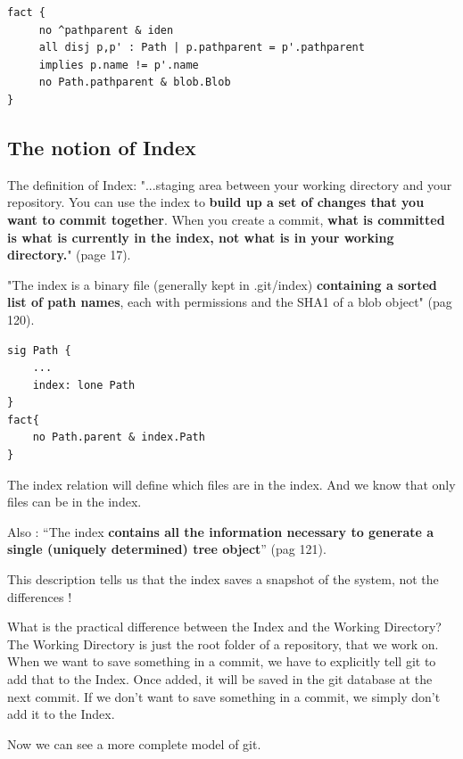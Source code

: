 \begin{lstlisting}
fact {
	 no ^pathparent & iden
	 all disj p,p' : Path | p.pathparent = p'.pathparent
	 implies p.name != p'.name
	 no Path.pathparent & blob.Blob
}
\end{lstlisting}

\subsection{The notion of Index}

The definition of Index:
"...staging area between your working directory and your
repository. You can use the index to {\bf build up a set of 
changes that you want to commit together}. When you create
a commit, {\bf what is committed is what is currently in the
index, not what is in your working directory.}"
\cite{gitComm} (page 17). \par

"The index is a binary file (generally kept in .git/index) 
{\bf containing a sorted list of path names}, each with permissions and the
SHA1 of a blob object" \cite{gitComm} (pag 120). \par 

\begin{lstlisting}
sig Path {
	...
	index: lone Path
}
fact{
	no Path.parent & index.Path
}
\end{lstlisting}

The index relation will define which files are in the index. And we know that only
files can be in the index. \par

Also : ``The index {\bf contains all the information necessary to generate a single
(uniquely determined) tree object}'' \cite{gitComm} (pag 121). \par
This description tells us that the index saves a snapshot of the system,
not the differences !

What is the practical difference between the Index and the Working
Directory? The Working Directory is just the root folder of a repository,
that we work on. When we want to save something in a commit, we have to explicitly 
tell git to add that to the Index. Once added, it
will be saved in the git database at the next commit. If we don't want to save
something in a commit, we simply don't add it to the Index.

Now we can see a more complete model of git.

